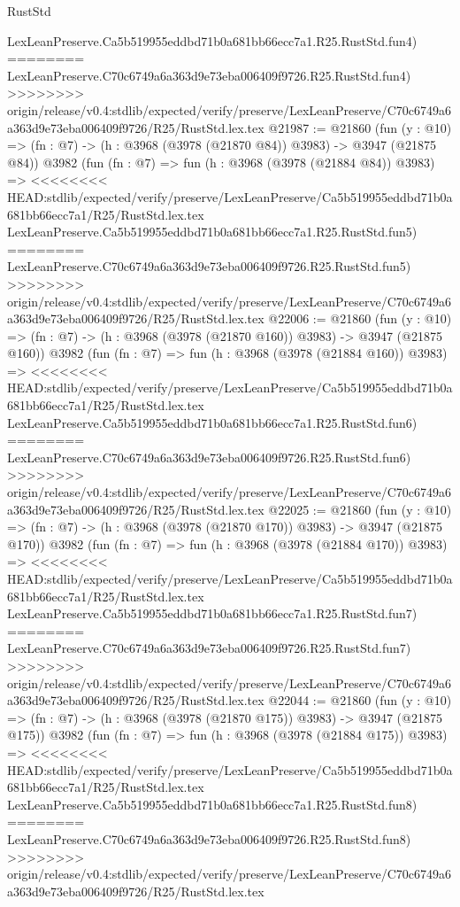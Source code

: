 \begin{lexlean}{RustStd}
\begin{coremodule}
{\begin{coremodule}
{{{{{{{{{{{{{{{{{{{{{{{{{{{{{{{{{{{{{{    LexLeanPreserve.Ca5b519955eddbd71b0a681bb66ecc7a1.R25.RustStd.fun4)
========
    LexLeanPreserve.C70c6749a6a363d9e73eba006409f9726.R25.RustStd.fun4)
>>>>>>>> origin/release/v0.4:stdlib/expected/verify/preserve/LexLeanPreserve/C70c6749a6a363d9e73eba006409f9726/R25/RustStd.lex.tex
@21987 := @21860
    (fun (y : @10) => (fn : @7) -> (h : @3968 (@3978 (@21870 @84)) @3983) -> @3947 (@21875 @84))
    @3982
    (fun (fn : @7) =>
    fun (h : @3968 (@3978 (@21884 @84)) @3983) =>
<<<<<<<< HEAD:stdlib/expected/verify/preserve/LexLeanPreserve/Ca5b519955eddbd71b0a681bb66ecc7a1/R25/RustStd.lex.tex
    LexLeanPreserve.Ca5b519955eddbd71b0a681bb66ecc7a1.R25.RustStd.fun5)
========
    LexLeanPreserve.C70c6749a6a363d9e73eba006409f9726.R25.RustStd.fun5)
>>>>>>>> origin/release/v0.4:stdlib/expected/verify/preserve/LexLeanPreserve/C70c6749a6a363d9e73eba006409f9726/R25/RustStd.lex.tex
@22006 := @21860
    (fun (y : @10) => (fn : @7) -> (h : @3968 (@3978 (@21870 @160)) @3983) -> @3947 (@21875 @160))
    @3982
    (fun (fn : @7) =>
    fun (h : @3968 (@3978 (@21884 @160)) @3983) =>
<<<<<<<< HEAD:stdlib/expected/verify/preserve/LexLeanPreserve/Ca5b519955eddbd71b0a681bb66ecc7a1/R25/RustStd.lex.tex
    LexLeanPreserve.Ca5b519955eddbd71b0a681bb66ecc7a1.R25.RustStd.fun6)
========
    LexLeanPreserve.C70c6749a6a363d9e73eba006409f9726.R25.RustStd.fun6)
>>>>>>>> origin/release/v0.4:stdlib/expected/verify/preserve/LexLeanPreserve/C70c6749a6a363d9e73eba006409f9726/R25/RustStd.lex.tex
@22025 := @21860
    (fun (y : @10) => (fn : @7) -> (h : @3968 (@3978 (@21870 @170)) @3983) -> @3947 (@21875 @170))
    @3982
    (fun (fn : @7) =>
    fun (h : @3968 (@3978 (@21884 @170)) @3983) =>
<<<<<<<< HEAD:stdlib/expected/verify/preserve/LexLeanPreserve/Ca5b519955eddbd71b0a681bb66ecc7a1/R25/RustStd.lex.tex
    LexLeanPreserve.Ca5b519955eddbd71b0a681bb66ecc7a1.R25.RustStd.fun7)
========
    LexLeanPreserve.C70c6749a6a363d9e73eba006409f9726.R25.RustStd.fun7)
>>>>>>>> origin/release/v0.4:stdlib/expected/verify/preserve/LexLeanPreserve/C70c6749a6a363d9e73eba006409f9726/R25/RustStd.lex.tex
@22044 := @21860
    (fun (y : @10) => (fn : @7) -> (h : @3968 (@3978 (@21870 @175)) @3983) -> @3947 (@21875 @175))
    @3982
    (fun (fn : @7) =>
    fun (h : @3968 (@3978 (@21884 @175)) @3983) =>
<<<<<<<< HEAD:stdlib/expected/verify/preserve/LexLeanPreserve/Ca5b519955eddbd71b0a681bb66ecc7a1/R25/RustStd.lex.tex
    LexLeanPreserve.Ca5b519955eddbd71b0a681bb66ecc7a1.R25.RustStd.fun8)
========
    LexLeanPreserve.C70c6749a6a363d9e73eba006409f9726.R25.RustStd.fun8)
>>>>>>>> origin/release/v0.4:stdlib/expected/verify/preserve/LexLeanPreserve/C70c6749a6a363d9e73eba006409f9726/R25/RustStd.lex.tex
}}}}}}}}}}}}}}}}}}}}}}}}}}}}}}}}}}}}}}
\end{coremodule}}
\end{coremodule}
\end{lexlean}
